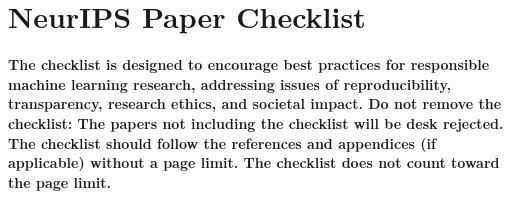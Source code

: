 \documentclass{article}
\begin{document}
\newpage
\section*{NeurIPS Paper Checklist}

\textbf{The checklist is designed to encourage best practices for responsible machine learning research, addressing issues of reproducibility, transparency, research ethics, and societal impact. Do not remove the checklist: The papers not including the checklist will be desk rejected. The checklist should follow the references and appendices (if applicable) without a page limit. The checklist does not count toward the page limit.}
\end{document}
